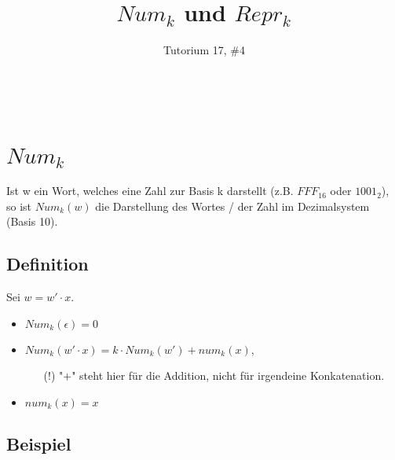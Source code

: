 \documentclass[11pt]{article} %
\title{$Num_k$ und $Repr_k$}
\author{Tutorium 17, \#4}
\date{} %
\begin{document}
\maketitle
\ \\
\section{$Num_k$}%

Ist w ein Wort, welches eine Zahl zur Basis k darstellt (z.B. $FFF_{16}$ oder $1001_2$), so ist $Num_k(w)$ die Darstellung des Wortes / der Zahl im Dezimalsystem (Basis 10).

\subsection{Definition} %

Sei $w = w' \cdot x$.
\begin{itemize}
	\item $Num_k(\epsilon) = 0$
	\item $Num_k(w' \cdot x) = k \cdot Num_k(w') + num_k(x)$, 
	\begin{itemize}
		\item[(!)] "$+$" steht hier für die Addition, nicht für irgendeine Konkatenation.
	\end{itemize}
	\item $num_k(x) = x$
\end{itemize}



\subsection{Beispiel} %
\end{document}
